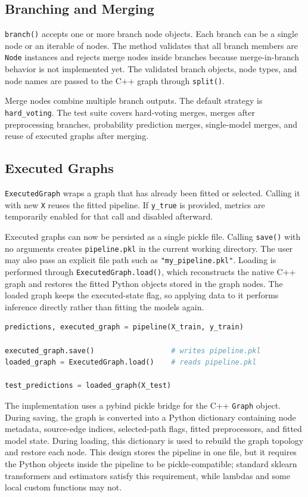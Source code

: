 \documentclass[11pt,a4paper]{article}
\begin{document}
\subsection{Branching and Merging}

\texttt{branch()} accepts one or more branch node objects. Each branch can be a
single node or an iterable of nodes. The method validates that all branch
members are \texttt{Node} instances and rejects merge nodes inside branches
because merge-in-branch behavior is not implemented yet. The validated branch
objects, node types, and node names are passed to the C++ graph through
\texttt{split()}.

Merge nodes combine multiple branch outputs. The default strategy is
\texttt{hard\_voting}. The test suite covers hard-voting merges, merges after
preprocessing branches, probability prediction merges, single-model merges, and
reuse of executed graphs after merging.

\subsection{Executed Graphs}

\texttt{ExecutedGraph} wraps a graph that has already been fitted or selected.
Calling it with new \texttt{X} reuses the fitted pipeline. If \texttt{y\_true}
is provided, metrics are temporarily enabled for that call and disabled
afterward.

Executed graphs can now be persisted as a single pickle file. Calling
\texttt{save()} with no arguments creates \texttt{pipeline.pkl} in the current
working directory. The user may also pass an explicit file path such as
\texttt{"my\_pipeline.pkl"}. Loading is performed through
\texttt{ExecutedGraph.load()}, which reconstructs the native C++ graph and
restores the fitted Python objects stored in the graph nodes. The loaded graph
keeps the executed-state flag, so applying data to it performs inference
directly rather than fitting the models again.

\begin{lstlisting}[language=Python]
predictions, executed_graph = pipeline(X_train, y_train)

executed_graph.save()                  # writes pipeline.pkl
loaded_graph = ExecutedGraph.load()    # reads pipeline.pkl

test_predictions = loaded_graph(X_test)
\end{lstlisting}

The implementation uses a pybind pickle bridge for the C++ \texttt{Graph}
object. During saving, the graph is converted into a Python dictionary
containing node metadata, source-edge indices, selected-path flags, fitted
preprocessors, and fitted model state. During loading, this dictionary is used
to rebuild the graph topology and restore each node. This design stores the
pipeline in one file, but it requires the Python objects inside the pipeline to
be pickle-compatible; standard sklearn transformers and estimators satisfy
this requirement, while lambdas and some local custom functions may not.
\end{document}
